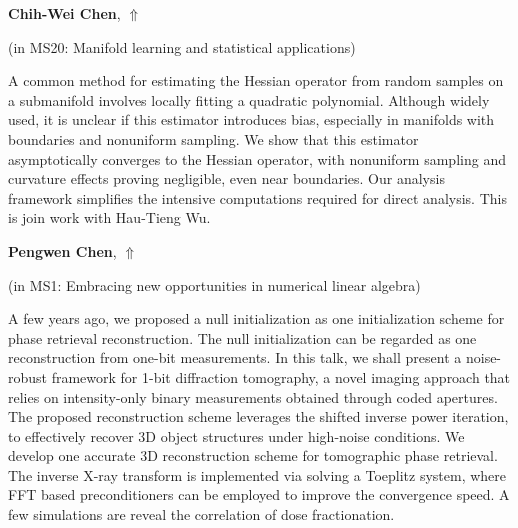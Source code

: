 \documentclass[ILAS2025-program.tex]{subfiles}
\begin{document}
\hypertarget{down0152}{}\begin{ilasabstract}
    
\textbf{Chih-Wei Chen},  \hfill \hyperlink{up0152}{$\Uparrow$}
    
    
(in {\color{mstitle}MS20: Manifold learning and statistical applications})
        
\mtskip
    A common method for estimating the Hessian operator from random samples on a submanifold involves locally fitting a quadratic polynomial. Although widely used, it is unclear if this estimator introduces bias, especially in manifolds with boundaries and nonuniform sampling. We show that this estimator asymptotically converges to the Hessian operator, with nonuniform sampling and curvature effects proving negligible, even near boundaries. Our analysis framework simplifies the intensive computations required for direct analysis. This is join work with Hau-Tieng Wu. 

\end{ilasabstract}
    

\hypertarget{down0306}{}\begin{ilasabstract}
    
\textbf{Pengwen Chen},  \hfill \hyperlink{up0306}{$\Uparrow$}
    
    
(in {\color{mstitle}MS1: Embracing new opportunities in numerical linear algebra})
        
\mtskip
    A few years ago, we proposed a null initialization as one initialization scheme for phase retrieval
reconstruction. The null initialization can be regarded as one reconstruction from  one-bit measurements. In this talk, we shall
present a noise-robust framework for 1-bit diffraction tomography, a novel imaging approach that
relies on intensity-only binary measurements obtained through coded apertures. The proposed
reconstruction scheme leverages the shifted inverse power iteration, to
effectively recover 3D object structures under high-noise conditions. We develop one accurate 3D
reconstruction scheme for tomographic phase retrieval. The inverse X-ray transform is implemented via 
solving a Toeplitz system, where FFT based preconditioners can be employed to improve the
convergence speed. A few simulations are reveal the correlation of dose fractionation.

\end{ilasabstract}
    
\end{document}

